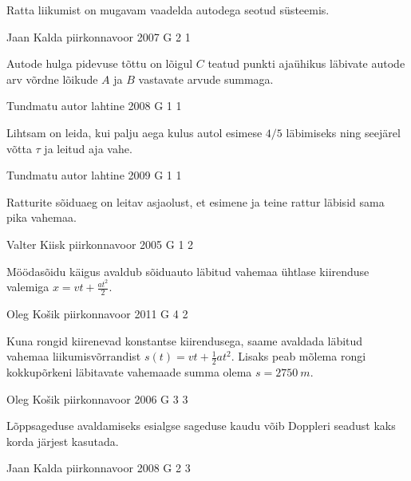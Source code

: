 \documentclass[11pt]{article}
\begin{document}
{{\ifHint
Ratta liikumist on mugavam vaadelda autodega seotud süsteemis.
\fi
}

{Jaan Kalda} %
{piirkonnavoor} %
{2007} %
{G 2} %
{1} %
{

\ifHint
Autode hulga pidevuse tõttu on lõigul $C$ teatud punkti ajaühikus läbivate autode arv võrdne lõikude $A$ ja $B$ vastavate arvude summaga.
\fi
}

{Tundmatu autor} %
{lahtine} %
{2008} %
{G 1} %
{1} %
{

\ifHint
Lihtsam on leida, kui palju aega kulus autol esimese $4/5$ läbimiseks ning seejärel võtta $\tau$ ja leitud aja vahe.
\fi
}

{Tundmatu autor} %
{lahtine} %
{2009} %
{G 1} %
{1} %
{

\ifHint
Ratturite sõiduaeg on leitav asjaolust, et esimene ja teine rattur läbisid sama pika vahemaa.
\fi
}

{Valter Kiisk} %
{piirkonnavoor} %
{2005} %
{G 1} %
{2} %
{

\ifHint
Möödasõidu käigus avaldub sõiduauto läbitud vahemaa ühtlase kiirenduse valemiga $x = vt + \frac{at^2}{2}$.
\fi
}

{Oleg Košik} %
{piirkonnavoor} %
{2011} %
{G 4} %
{2} %
{

\ifHint
Kuna rongid kiirenevad konstantse kiirendusega, saame avaldada läbitud vahemaa liikumisvõrrandist $s(t) = vt + \frac{1}{2}at^2$. Lisaks peab mõlema rongi kokkupõrkeni läbitavate vahemaade summa olema $s = \SI{2750}{m}$.
\fi
}

{Oleg Košik} %
{piirkonnavoor} %
{2006} %
{G 3} %
{3} %
{

\ifHint
Lõppsageduse avaldamiseks esialgse sageduse kaudu võib Doppleri seadust kaks korda järjest kasutada.
\fi
}

{Jaan Kalda} %
{piirkonnavoor} %
{2008} %
{G 2} %
{3} %
{

}}
\end{document}
